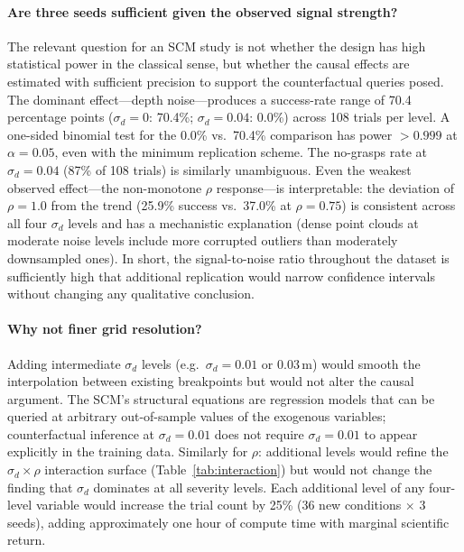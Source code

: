 \documentclass[11pt,a4paper]{report}
\begin{document}
\paragraph{Are three seeds sufficient given the observed signal strength?}
The relevant question for an SCM study is not whether the design has high statistical power in the classical sense, but whether the causal effects are estimated with sufficient precision to support the counterfactual queries posed. The dominant effect---depth noise---produces a success-rate range of 70.4 percentage points ($\sigma_d = 0$: 70.4\%; $\sigma_d = 0.04$: 0.0\%) across 108 trials per level. A one-sided binomial test for the 0.0\% vs.\ 70.4\% comparison has power $> 0.999$ at $\alpha = 0.05$, even with the minimum replication scheme. The no-grasps rate at $\sigma_d = 0.04$ (87\% of 108 trials) is similarly unambiguous. Even the weakest observed effect---the non-monotone $\rho$ response---is interpretable: the deviation of $\rho = 1.0$ from the trend (25.9\% success vs.\ 37.0\% at $\rho = 0.75$) is consistent across all four $\sigma_d$ levels and has a mechanistic explanation (dense point clouds at moderate noise levels include more corrupted outliers than moderately downsampled ones). In short, the signal-to-noise ratio throughout the dataset is sufficiently high that additional replication would narrow confidence intervals without changing any qualitative conclusion.

\paragraph{Why not finer grid resolution?}
Adding intermediate $\sigma_d$ levels (e.g.\ $\sigma_d = 0.01$ or $0.03$\,m) would smooth the interpolation between existing breakpoints but would not alter the causal argument. The SCM's structural equations are regression models that can be queried at arbitrary out-of-sample values of the exogenous variables; counterfactual inference at $\sigma_d = 0.01$ does not require $\sigma_d = 0.01$ to appear explicitly in the training data. Similarly for $\rho$: additional levels would refine the $\sigma_d \times \rho$ interaction surface (Table~\ref{tab:interaction}) but would not change the finding that $\sigma_d$ dominates at all severity levels. Each additional level of any four-level variable would increase the trial count by 25\% (36 new conditions $\times$ 3 seeds), adding approximately one hour of compute time with marginal scientific return.
\end{document}
